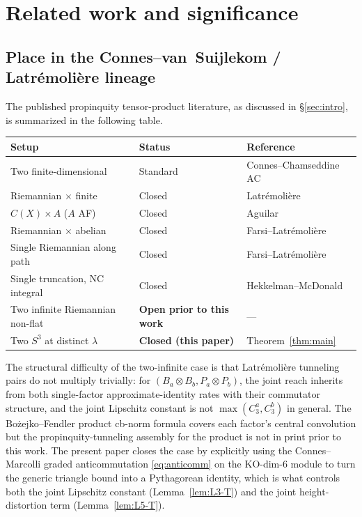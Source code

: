 \documentclass[11pt,a4paper]{article}
\theoremstyle{plain}
\theoremstyle{definition}
\newcommand{\sthree}{S^{3}}
\begin{document}
\section{Related work and significance}\label{sec:related_work}

\subsection{Place in the Connes--van~Suijlekom / Latr\'emoli\`ere
lineage}\label{sec:place_in_lineage}

The published propinquity tensor-product literature, as discussed in
\S\ref{sec:intro}, is summarized in the following table.

\begin{center}
\begin{tabular}{lll}
\toprule
Setup & Status & Reference \\
\midrule
Two finite-dimensional & Standard & Connes--Chamseddine AC \\
Riemannian $\times$ finite & Closed & Latr\'emoli\`ere~\cite{latremoliere2026} \\
$C(X) \times A$ ($A$ AF) & Closed & Aguilar~\cite{aguilar2019} \\
Riemannian $\times$ abelian & Closed & Farsi--Latr\'emoli\`ere~\cite{farsi_latremoliere2024} \\
Single Riemannian along path & Closed & Farsi--Latr\'emoli\`ere~\cite{farsi_latremoliere2025} \\
Single truncation, NC integral & Closed & Hekkelman--McDonald~\cite{hekkelman_mcdonald2024b} \\
Two infinite Riemannian non-flat & \textbf{Open prior to this work} & --- \\
\midrule
Two $\sthree$ at distinct $\lambda$ & \textbf{Closed (this paper)} & Theorem~\ref{thm:main} \\
\bottomrule
\end{tabular}
\end{center}

The structural difficulty of the two-infinite case is that
Latr\'emoli\`ere tunneling pairs do not multiply trivially: for
$(B_a \otimes B_b, P_a \otimes P_b)$, the joint reach inherits from
both single-factor approximate-identity rates with their commutator
structure, and the joint Lipschitz constant is not $\max(C_3^a,
C_3^b)$ in general. The Bo{\.z}ejko--Fendler product cb-norm formula
covers each factor's central convolution but the propinquity-tunneling
assembly for the product is not in print prior to this work. The
present paper closes the case by explicitly using the Connes--Marcolli
graded anticommutation \eqref{eq:anticomm} on the KO-dim-6 module to
turn the generic triangle bound into a Pythagorean identity, which is
what controls both the joint Lipschitz constant
(Lemma~\ref{lem:L3-T}) and the joint height-distortion term
(Lemma~\ref{lem:L5-T}).
\end{document}
